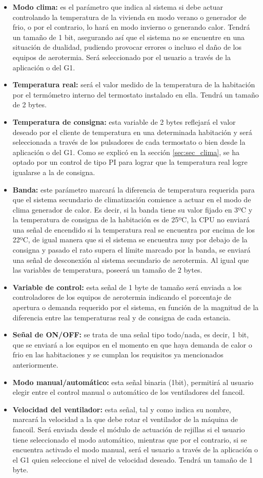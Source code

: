 \begin{itemize}
\item \textbf{Modo clima:} es el parámetro que indica al sistema si debe actuar controlando la temperatura de la vivienda en modo verano o generador de frio, o por el contrario, lo hará en modo invierno o generando calor. Tendrá un tamaño de 1 bit, asegurando así que el sistema no se encuentre en una situación de dualidad, pudiendo provocar errores o incluso el daño de los equipos de aerotermia. Será seleccionado por el usuario a través de la aplicación o del G1.
\item \textbf{Temperatura real:} será el valor medido de la temperatura de la habitación por el termómetro interno del termostato instalado en ella. Tendrá un tamaño de 2 bytes.
\item \textbf{Temperatura de consigna:} esta variable de 2 bytes reflejará el valor deseado por el cliente de temperatura en una determinada habitación y será seleccionada a través de los pulsadores de cada termostato o bien desde la aplicación o del G1. Como se explicó en la sección \ref{sec:sec_clima}, se ha optado por un control de tipo PI para lograr que la temperatura real logre igualarse a la de consigna.
\item \textbf{Banda:} este parámetro marcará la diferencia de temperatura requerida para que el sistema secundario de climatización comience a actuar en el modo de clima generador de calor. Es decir, si la banda tiene su valor fijado en 3ºC y la temperatura de consigna de la habitación es de 25ºC, la CPU no enviará una señal de encendido si la temperatura real se encuentra por encima de los 22ºC, de igual manera que si el sistema se encuentra muy por debajo de la consigna y pasado el rato supera el límite marcado por la banda, se enviará una señal de desconexión al sistema secundario de aerotermia. Al igual que las variables de temperatura, poseerá un tamaño de 2 bytes.
\item \textbf{Variable de control:} esta señal de 1 byte de tamaño será enviada a los controladores de los equipos de aerotermia indicando el porcentaje de apertura o demanda requerido por el sistema, en función de la magnitud de la diferencia entre las temperaturas real y de consigna de cada estancia.
\item \textbf{Señal de ON/OFF:} se trata de una señal tipo todo/nada, es decir, 1 bit,  que se enviará a los equipos en el momento en que haya demanda de calor o frio en las habitaciones y se cumplan los requisitos ya mencionados anteriormente.
\item \textbf{Modo manual/automático:} esta señal binaria (1bit), permitirá al usuario elegir entre el control manual o automático de los ventiladores del fancoil.
\item \textbf{Velocidad del ventilador:} esta señal, tal y como indica su nombre, marcará la velocidad a la que debe rotar el ventilador de la máquina de fancoil. Será enviada desde el módulo de actuación de rejillas si el usuario tiene seleccionado el modo automático, mientras que por el contrario, si se encuentra activado el modo manual, será el usuario a través de la aplicación o el G1 quien seleccione el nivel de velocidad deseado. Tendrá un tamaño de 1 byte.
\end{itemize}
